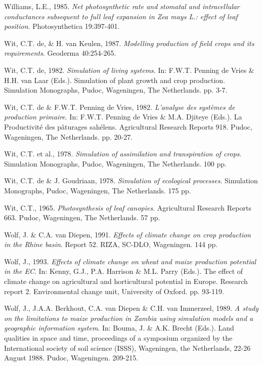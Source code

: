 Williams, L.E., 1985. {\it Net photosynthetic rate and stomatal and intracellular conductances
subsequent to full leaf expansion in Zea mays L.: effect of leaf position\/}. Photosynthetica 19:397-401.

Wit, C.T. de, \& H. van Keulen, 1987. {\it Modelling production of field crops and its requirements\/}.
Geoderma 40:254-265.

 Wit, C.T. de, 1982. {\it Simulation of living systems\/}. In: F.W.T. Penning de Vries \& H.H. van Laar
(Eds.). Simulation of plant growth and crop production. Simulation Monographs, Pudoc,
Wageningen, The Netherlands. pp. 3-7.

Wit, C.T. de \& F.W.T. Penning de Vries, 1982. {\it L'analyse des syst\`{e}mes de production primaire\/}.
In: F.W.T. Penning de Vries \& M.A. Djiteye (Eds.). La Productivit\'{e} des p\^{a}turages sah\'{e}lens.
Agricultural Research Reports 918. Pudoc, Wageningen, The Netherlands. pp. 20-27.

Wit, C.T. et al., 1978. {\it Simulation of assimilation and transpiration of crops\/}. Simulation
Monographs, Pudoc, Wageningen, The Netherlands. 100 pp.

Wit, C.T. de \& J. Goudriaan, 1978. {\it Simulation of ecological processes\/}. Simulation Monographs,
Pudoc, Wageningen, The Netherlands. 175 pp.

Wit, C.T., 1965. {\it Photosynthesis of leaf canopies\/}. Agricultural Research Reports 663. Pudoc,
Wageningen, The Netherlands. 57 pp.

Wolf, J. \& C.A. van Diepen, 1991. {\it Effects of climate change on crop production in the Rhine basin\/}.
Report 52. RIZA, SC-DLO, Wageningen. 144 pp.

Wolf, J., 1993. {\it Effects of climate change on wheat and maize production potential in the EC\/}. In:
Kenny, G.J., P.A. Harrison \& M.L. Parry (Eds.). The effect of climate change on agricultural and
horticultural potential in Europe. Research report 2. Environmental change unit, University of
Oxford. pp. 93-119.

Wolf, J., J.A.A. Berkhout, C.A. van Diepen \& C.H. van {\nobreak}Immerzeel, 1989. {\it A study on the
limitations to maize production in Zambia using simulation models and a geo\-graphic information
system\/}. In: Bouma, J. \& A.K. Brecht (Eds.). Land qualities in space and time, proceedings of a
symposium organized by the International society of soil science (ISSS), Wageningen, the
Netherlands, 22-26 August 1988. Pudoc, Wageningen. 209-215.

